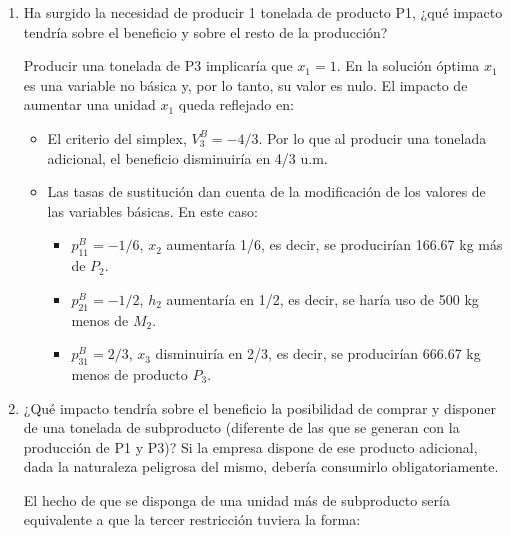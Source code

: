 \begin{enumerate}
    
    Por lo tanto, se debe cumplir $\frac{-10+c_2}{6} \leq 0$ y $-\frac{c_2+8}{6} \leq 0$, es decir, $c_2 \leq 10$ y $c_2 \geq -8$.

    Mientras el margen del producto P1 sea igual o superior a $-8$ (no de pérdidas superiores a 8 u.m.) y no sea mayor 10, la gama de productos es la que se indica en el apartado anterior.



    \item Ha surgido la necesidad de producir 1 tonelada de producto P1, ¿qué impacto tendría sobre el beneficio y sobre el resto de la producción?

    Producir una tonelada de P3 implicaría que $x_1 = 1$. En la solución óptima $x_1$ es una variable no básica y, por lo tanto, su valor es nulo. El impacto de aumentar una unidad $x_1$ queda reflejado en:

    \begin{itemize}
        \item El criterio del simplex, $V^B_3 = -4/3$. Por lo que al producir una tonelada adicional, el beneficio disminuiría en 4/3 u.m.
        \item Las tasas de sustitución dan cuenta de la modificación de los valores de las variables básicas. En este caso:
        \begin{itemize}
            \item $p^B_{11} = -1/6$, $x_2$ aumentaría 1/6, es decir, se producirían 166.67 kg más de $P_2$.
            \item $p^B_{21} = -1/2$, $h_2$ aumentaría en 1/2, es decir, se haría uso de 500 kg menos de $M_2$.
            \item $p^B_{31} = 2/3$, $x_3$ disminuiría en 2/3, es decir, se producirían 666.67 kg menos de producto $P_3$.
        \end{itemize}
    \end{itemize}

     
    
    \item ¿Qué impacto tendría sobre el beneficio la posibilidad de comprar y disponer de una tonelada de subproducto (diferente de las que se generan con la producción de P1 y P3)? Si la empresa dispone de ese producto adicional, dada la naturaleza peligrosa del mismo, debería consumirlo obligatoriamente.

    El hecho de que se disponga de una unidad más de subproducto sería equivalente a que la tercer restricción tuviera la forma:
    

\end{enumerate}
